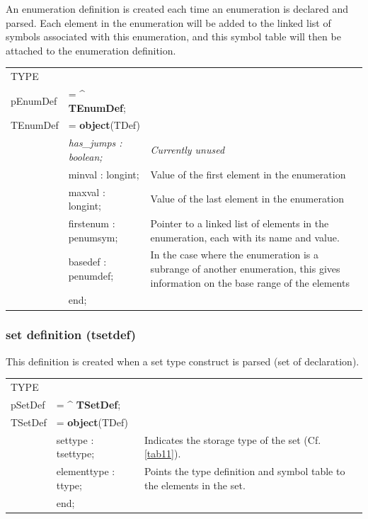 \documentclass [a4paper,12pt]{article}
\begin{document}
An enumeration definition is created each time an enumeration is declared
and parsed. Each element in the enumeration will be added to the linked list
of symbols associated with this enumeration, and this symbol table will then
be attached to the enumeration definition.

\begin{tabular*}{6,5in}{|l@{\extracolsep{\fill}}lp{}|}
\hline
\textsf{TYPE} & & \\
\xspace \textsf{pEnumDef} &= \^{} \textbf{TEnumDef};&  \\
\xspace \textsf{TEnumDef} &= \textbf{object}(TDef) & \\
&\textsf{\textit{has{\_}jumps : boolean;}}&
    \textit{Currently unused} \\
&\textsf{minval : longint;}&
    Value of the first element in the enumeration \\
&\textsf{maxval : longint;}&
    Value of the last element in the enumeration \\
&\textsf{firstenum : penumsym;}&
    Pointer to a linked list of elements in the enumeration, each with
    its name and value. \\
&\textsf{basedef : penumdef;}&
    In the case where the enumeration is a subrange of another enumeration,
    this gives information on the base range of the elements \\
&\textsf{end;}&  \\
\hline
\end{tabular*}

\subsubsection{set definition (tsetdef)}
\label{subsubsec:mylabel10}

This definition is created when a set type construct is parsed (\textsf{set
of declaration}).

\begin{tabular*}{6.5in}{|l@{\extracolsep{\fill}}lp{}|}
\hline
\textsf{TYPE} & & \\
\xspace \textsf{pSetDef} &= \^{} \textbf{TSetDef};&  \\
\xspace \textsf{TSetDef} &= \textbf{object}(TDef) & \\
&\textsf{settype : tsettype;}&
    Indicates the storage type of the set (Cf. \ref{tab11}). \\
&\textsf{elementtype : ttype;}&
    Points the type definition and symbol table to the elements in the set. \\
&\textsf{end;}&  \\
\hline
\end{tabular*}
\end{document}
